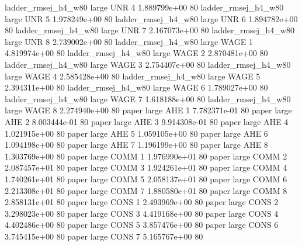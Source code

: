 ladder_rmsej_h4_w80      large      UNR                 4 1.889799e+00 80
ladder_rmsej_h4_w80      large      UNR                 5 1.978249e+00 80
ladder_rmsej_h4_w80      large      UNR                 6 1.894782e+00 80
ladder_rmsej_h4_w80      large      UNR                 7 2.167073e+00 80
ladder_rmsej_h4_w80      large      UNR                 8 2.739002e+00 80
ladder_rmsej_h4_w80      large     WAGE                 1 4.819974e+00 80
ladder_rmsej_h4_w80      large     WAGE                 2 2.870481e+00 80
ladder_rmsej_h4_w80      large     WAGE                 3 2.754407e+00 80
ladder_rmsej_h4_w80      large     WAGE                 4 2.585428e+00 80
ladder_rmsej_h4_w80      large     WAGE                 5 2.394311e+00 80
ladder_rmsej_h4_w80      large     WAGE                 6 1.789027e+00 80
ladder_rmsej_h4_w80      large     WAGE                 7 1.618188e+00 80
ladder_rmsej_h4_w80      large     WAGE                 8 2.274940e+00 80
              paper      large      AHE                 1 7.782371e-01 80
              paper      large      AHE                 2 8.003444e-01 80
              paper      large      AHE                 3 9.914308e-01 80
              paper      large      AHE                 4 1.021915e+00 80
              paper      large      AHE                 5 1.059105e+00 80
              paper      large      AHE                 6 1.094198e+00 80
              paper      large      AHE                 7 1.196199e+00 80
              paper      large      AHE                 8 1.303769e+00 80
              paper      large     COMM                 1 1.976990e+01 80
              paper      large     COMM                 2 2.087457e+01 80
              paper      large     COMM                 3 1.924261e+01 80
              paper      large     COMM                 4 1.740261e+01 80
              paper      large     COMM                 5 2.058137e+01 80
              paper      large     COMM                 6 2.213308e+01 80
              paper      large     COMM                 7 1.880580e+01 80
              paper      large     COMM                 8 2.858131e+01 80
              paper      large     CONS                 1 2.493969e+00 80
              paper      large     CONS                 2 3.298023e+00 80
              paper      large     CONS                 3 4.419168e+00 80
              paper      large     CONS                 4 4.402486e+00 80
              paper      large     CONS                 5 3.857476e+00 80
              paper      large     CONS                 6 3.745415e+00 80
              paper      large     CONS                 7 5.165767e+00 80
